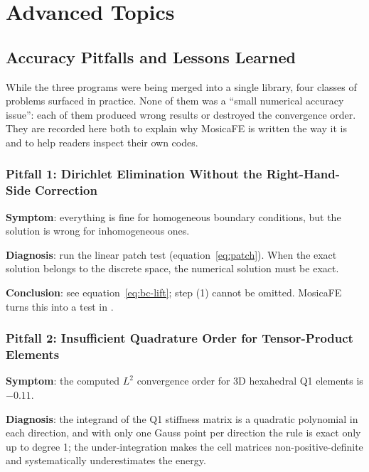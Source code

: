 \documentclass[11pt,oneside]{book}
\theoremstyle{definition}
\theoremstyle{plain}
\newcommand{\mosica}{\textsf{MosicaFE}}
\begin{document}
\chapter{Advanced Topics}
\label{chap:advanced}

\section{Accuracy Pitfalls and Lessons Learned}
\label{sec:pitfall-vem}

While the three programs were being merged into a single library, four classes of
problems surfaced in practice. None of them was a ``small numerical accuracy
issue'': each of them produced wrong results or destroyed the convergence order.
They are recorded here both to explain why \mosica{} is written the way it is and to
help readers inspect their own codes.

\subsection{Pitfall 1: Dirichlet Elimination Without the Right-Hand-Side Correction}

\textbf{Symptom}: everything is fine for homogeneous boundary conditions, but the
solution is wrong for inhomogeneous ones.

\textbf{Diagnosis}: run the linear patch test (equation~\eqref{eq:patch}). When the
exact solution belongs to the discrete space, the numerical solution must be exact.

\textbf{Conclusion}: see equation~\eqref{eq:bc-lift}; step (1) cannot be omitted.
\mosica{} turns this into a test in .

\subsection{Pitfall 2: Insufficient Quadrature Order for Tensor-Product Elements}

\textbf{Symptom}: the computed $L^2$ convergence order for 3D hexahedral Q1 elements
is $-0.11$.

\textbf{Diagnosis}: the integrand of the Q1 stiffness matrix is a quadratic
polynomial in each direction, and with only one Gauss point per direction the rule is
exact only up to degree 1; the under-integration makes the cell matrices
non-positive-definite and systematically underestimates the energy.
\end{document}

